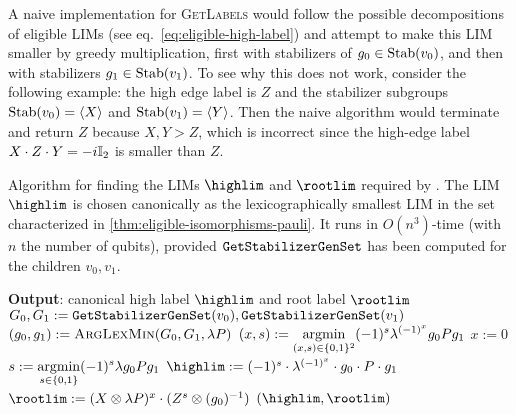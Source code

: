 
A naive implementation for \textsc{GetLabels} would follow the possible decompositions of eligible LIMs (see eq.~\eqref{eq:eligible-high-label}) and attempt to make this LIM smaller by greedy multiplication, first  with stabilizers of
$g_0 \in \Aut(v_0)$, and then with stabilizers $g_1\in \Aut(v_1)$.
To see why this does not work, consider the following example:
the high edge label is $Z$ and the stabilizer subgroups $\Aut(v_0) = \langle X\rangle$ and $\Aut(v_1) = \langle Y \rangle$.
Then the naive algorithm would terminate and return $Z$ because $X, Y> Z$, which is incorrect since the high-edge label $X \cdot Z \cdot Y = -i \id[2]$ is smaller than $Z$.

\begin{algorithm}
	\caption{
		Algorithm for finding the LIMs $\highlim$ and $\rootlim$ required by \makeedge.
		The LIM $\highlim$ is chosen canonically as the lexicographically smallest LIM in 
		the set characterized in \autoref{thm:eligible-isomorphisms-pauli}.
		It runs in $O(n^3)$-time (with $n$ the number of qubits),
		provided $\getautomorphisms$ has been computed for the children $v_0, v_1$.
		\label{alg:find-canonical-edges}
	}
	\begin{algorithmic}[1]
		\Statex \textbf{Output}: canonical high label $\highlim$ and root label $\rootlim$
		\State $G_0, G_1 := \getautomorphisms(v_0), \getautomorphisms(v_1)$
		\State $(g_0, g_1) := \textsc{ArgLexMin}(G_0, G_1, \lambda P)$
		\label{line:getlabels-argmin}
		\label{algline:getlabels-start-minimizing}
		\State $(x,s):=\displaystyle\argmin_{(x,s)\in\{0,1\}^2}(-1)^s\lambda^{(-1)^x}g_0Pg_1$
		\Else
		\State $x:=0$
		\State $s:=\displaystyle \argmin_{s\in \{0,1\}} (-1)^s\lambda g_0Pg_1$
		\label{line:minimized-lim} 
		\EndIf
		\State $\highlim := (-1)^s \cdot \lambda^{(-1)^x} \cdot g_0 \cdot P \cdot g_1$
		\State $\rootlim := (X \otimes \lambda P)^{x} \cdot (Z^s \otimes (g_0)^{-1})$
		\State \Return $(\highlim, \rootlim)$
		\EndProcedure
	\end{algorithmic}
\end{algorithm}

